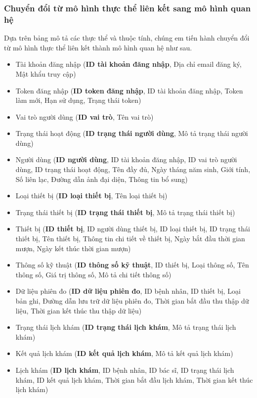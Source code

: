 \subsubsection{Chuyển đổi từ mô hình thực thể liên kết sang mô hình quan hệ}
Dựa trên bảng mô tả các thực thể và thuộc tính, chúng em tiến hành chuyển đổi từ mô hình thực thể liên kết thành mô hình quan hệ như sau.

\begin{itemize}
	\item Tài khoản đăng nhập (\textbf{ID tài khoản đăng nhập}, Địa chỉ email đăng ký, Mật khẩu truy cập)
	\item Token đăng nhập (\textbf{ID token đăng nhập}, ID tài khoản đăng nhập, Token làm mới, Hạn sử dụng, Trạng thái token)
	\item Vai trò người dùng (\textbf{ID vai trò}, Tên vai trò)
	\item Trạng thái hoạt động (\textbf{ID trạng thái người dùng}, Mô tả trạng thái người dùng)
	\item Người dùng (\textbf{ID người dùng}, ID tài khoản đăng nhập, ID vai trò người dùng, ID trạng thái hoạt động, Tên đầy đủ, Ngày tháng năm sinh, Giới tính, Số liên lạc, Đường dẫn ảnh đại diện, Thông tin bổ sung)
	\item Loại thiết bị (\textbf{ID loại thiết bị}, Tên loại thiết bị)
	\item Trạng thái thiết bị (\textbf{ID trạng thái thiết bị}, Mô tả trạng thái thiết bị)
	\item Thiết bị (\textbf{ID thiết bị}, ID người dùng thiết bị, ID loại thiết bị, ID trạng thái thiết bị, Tên thiết bị, Thông tin chi tiết về thiết bị, Ngày bắt đầu thời gian mượn, Ngày kết thúc thời gian mượn)
	\item Thông số kỹ thuật (\textbf{ID thông số kỹ thuật}, ID thiết bị, Loại thông số, Tên thông số, Giá trị thông số, Mô tả chi tiết thông số)
	\item Dữ liệu phiên đo (\textbf{ID dữ liệu phiên đo}, ID bệnh nhân, ID thiết bị, Loại bản ghi, Đường dẫn lưu trữ dữ liệu phiên đo, Thời gian bắt đầu thu thập dữ liệu, Thời gian kết thúc thu thập dữ liệu)
	\item Trạng thái lịch khám (\textbf{ID trạng thái lịch khám}, Mô tả trạng thái lịch khám)
	\item Kết quả lịch khám (\textbf{ID kết quả lịch khám}, Mô tả kết quả lịch khám)
	\item Lịch khám (\textbf{ID lịch khám}, ID bệnh nhân, ID bác sĩ, ID trạng thái lịch khám, ID kết quả lịch khám, Thời gian bắt đầu lịch khám, Thời gian kết thúc lịch khám)

\end{itemize}
